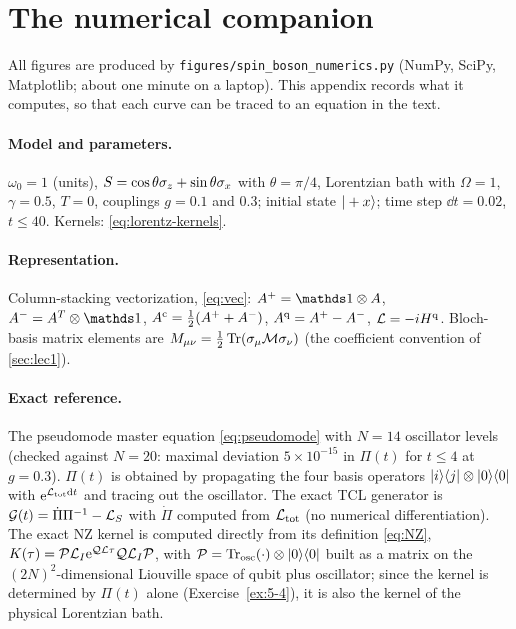\appendix
\section{The numerical companion}
\label{sec:numerics}

All figures are produced by \texttt{figures/spin\_boson\_numerics.py} (NumPy, SciPy, Matplotlib; about one minute on a laptop).
This appendix records what it computes, so that each curve can be traced to an equation in the text.

\paragraph{Model and parameters.}
$\omega_0=1$ (units), $S=\cos\theta\sigma_z+\sin\theta\sigma_x$ with $\theta=\pi/4$, Lorentzian bath with $\Omega=1$, $\gamma=0.5$, $T=0$, couplings $g=0.1$ and $0.3$; initial state $|+x\rangle$; time step $\dd t=0.02$, $t\le40$.
Kernels: \cref{eq:lorentz-kernels}.

\paragraph{Representation.}
Column-stacking vectorization, \cref{eq:vec}: $A^+=\Id\otimes A$, $A^-=A^T\otimes\Id$, $A^{\mathrm{c}}=\tfrac12(A^++A^-)$, $A^{\mathrm{q}}=A^+-A^-$, $\mathcal{L}=-iH^{\mathrm{q}}$.
Bloch-basis matrix elements are $M_{\mu\nu}=\tfrac12\operatorname{Tr}(\sigma_\mu\mathcal M\sigma_\nu)$ (the coefficient convention of \cref{sec:lec1}).

\paragraph{Exact reference.}
The pseudomode master equation \eqref{eq:pseudomode} with $N=14$ oscillator levels (checked against $N=20$: maximal deviation $5\times10^{-15}$ in $\Pi(t)$ for $t\le4$ at $g=0.3$).
$\Pi(t)$ is obtained by propagating the four basis operators $|i\rangle\langle j|\otimes|0\rangle\langle0|$ with $\mathrm{e}^{\mathcal{L}_{\rm tot}\mathrm{d} t}$ and tracing out the oscillator.
The exact TCL generator is $\mathcal{G}(t)=\dot\Pi\Pi^{-1}-\mathcal{L}_S$ with $\dot\Pi$ computed from $\mathcal{L}_{\rm tot}$ (no numerical differentiation).
The exact NZ kernel is computed directly from its definition \eqref{eq:NZ}, $K(\tau)=\mathcal{P}\mathcal{L}_I\mathrm{e}^{\mathcal{Q}\mathcal{L}\tau}\mathcal{Q}\mathcal{L}_I\mathcal{P}$, with $\mathcal{P}=\operatorname{Tr}_{\rm osc}(\cdot)\otimes|0\rangle\langle0|$ built as a matrix on the $(2N)^2$-dimensional Liouville space of qubit plus oscillator; since the kernel is determined by $\Pi(t)$ alone (Exercise~\ref{ex:5-4}), it is also the kernel of the physical Lorentzian bath.

